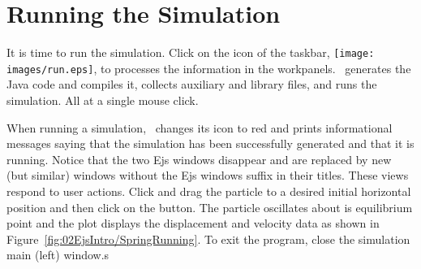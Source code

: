 \section{Running the Simulation}\label{section:02Running}

It is time to run the simulation. Click on the  icon of the taskbar, \texttt{[image: images/run.eps]}, to processes the information in the workpanels.  \Ejs\ generates the Java code and compiles it, collects auxiliary and library files, and runs the simulation. All at a single mouse click.

When running a simulation, \ejs\ changes its  icon to red and prints informational messages saying that the simulation has been successfully generated and that it is running. Notice that the two Ejs windows disappear and are replaced by new (but similar) windows without the Ejs windows suffix in their titles.  These views respond to user actions. Click and drag the particle to a desired initial horizontal position and then click on the  button. The particle oscillates about is equilibrium point and the plot displays the displacement and velocity data as shown in Figure~\ref{fig:02EjsIntro/SpringRunning}. To exit the program, close the simulation main (left) window.s

